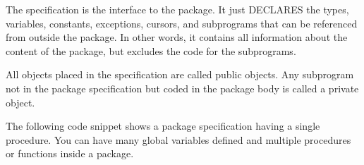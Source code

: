 The specification is the interface to the package. It just DECLARES the types, variables, constants, exceptions, cursors, and subprograms that can be referenced from outside the package. In other words, it contains all information about the content of the package, but excludes the code for the subprograms.

All objects placed in the specification are called public objects. Any subprogram not in the package specification but coded in the package body is called a private object.

The following code snippet shows a package specification having a single procedure. You can have many global variables defined and multiple procedures or functions inside a package.




\clearpage
